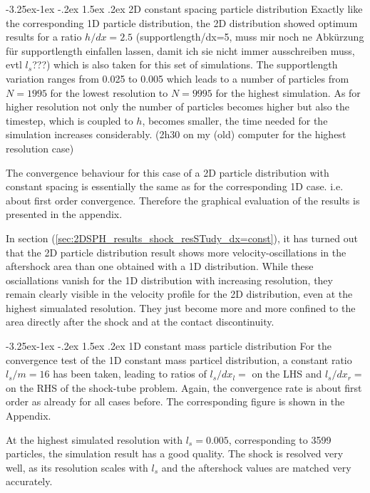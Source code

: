 \documentclass{report}
\makeatletter
\renewcommand\paragraph{\@startsection{paragraph}{4}{\z@}%
  {-3.25ex\@plus -1ex \@minus -.2ex}%
  {1.5ex \@plus .2ex}%
  {\normalfont\normalsize\bfseries}}
\makeatother
\begin{document}
\paragraph{2D constant spacing particle distribution}
Exactly like the corresponding 1D particle distribution, the 2D distribution showed optimum results for a ratio $h/dx=2.5$ (supportlength/dx=5, muss mir noch ne Abkürzung für supportlength einfallen lassen, damit ich sie nicht immer ausschreiben muss, evtl $l_s$???) which is also taken for this set of simulations. The supportlength variation ranges from 0.025 to 0.005 which leads to a number of particles from $N=1995$ for the lowest resolution to $N=9995$ for the highest simulation. As for higher resolution not only the number of particles becomes higher but also the timestep, which is coupled to $h$, becomes smaller, the time needed for the simulation increases considerably. (2h30 on my (old) computer for the highest resolution case)

The convergence behaviour for this case of a 2D particle distribution with constant spacing is essentially the same as for the corresponding 1D case. i.e. about first order convergence. Therefore the graphical evaluation of the results is presented in the appendix.

In section (\ref{sec:2DSPH_results_shock_resSTudy_dx=const}), it has turned out that the 2D particle distribution result shows more velocity-oscillations in the aftershock area than one obtained with a 1D distribution. While these osciallations vanish for the 1D distribution with increasing resolution, they remain clearly visible in the velocity profile for the 2D distribution, even at the highest simualated resolution. They just become more and more confined to the area directly after the shock and at the contact discontinuity. 

 
\paragraph{1D constant mass particle distribution}
For the convergence test of the 1D constant mass particel distribution, a constant ratio $l_s/m=16$ has been taken, leading to ratios of $l_s/dx_l=$ on the LHS and $l_s/dx_r=$ on the RHS of the shock-tube problem. Again, the convergence rate is about first order as already for all cases before. The corresponding figure is shown in the Appendix. 

At the highest simulated resolution with $l_s=0.005$, corresponding to 3599 particles, the simulation result has a good quality. The shock is resolved very well, as its resolution scales with $l_s$ and the aftershock values are matched very accurately.
\end{document}
